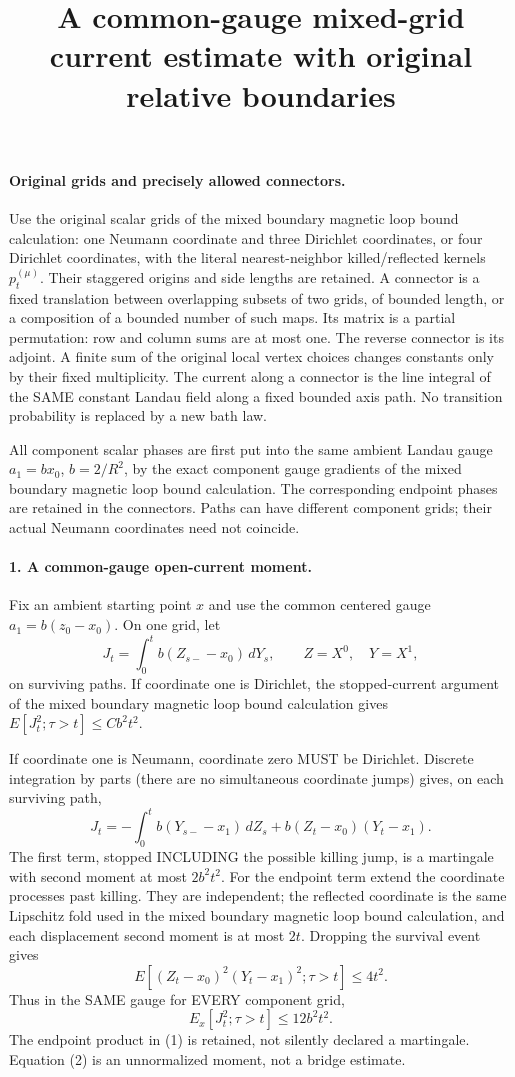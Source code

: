 \documentclass[11pt]{article}
\title{A common-gauge mixed-grid current estimate with original relative boundaries}\author{}\date{}
\begin{document}
\maketitle
\paragraph{Original grids and precisely allowed connectors.}
Use the original scalar grids of the mixed boundary magnetic loop bound calculation: one Neumann coordinate and
three Dirichlet coordinates, or four Dirichlet coordinates, with the
literal nearest-neighbor killed/reflected kernels $p_t^{(\mu)}$.
Their staggered origins and side lengths are retained. A connector is a
fixed translation between overlapping subsets of two grids, of bounded
length, or a composition of a bounded number of such maps.
Its matrix is a partial permutation: row and column sums are at most one.
The reverse connector is its adjoint. A finite sum of the original local
vertex choices changes constants only by their fixed multiplicity.
The current along a connector is the line integral of the SAME constant
Landau field along a fixed bounded axis path. No transition probability
is replaced by a new bath law.

All component scalar phases are first put into the same ambient Landau
gauge $a_1=b x_0$, $b=2/R^2$, by the exact component gauge gradients of
the mixed boundary magnetic loop bound calculation. The corresponding endpoint phases are retained in the
connectors. Paths can have different component grids; their actual
Neumann coordinates need not coincide.

\paragraph{1. A common-gauge open-current moment.}
Fix an ambient starting point $x$ and use the common centered gauge
$a_1=b(z_0-x_0)$. On one grid, let
\[
 J_t=\int_0^t b(Z_{s-}-x_0)\,dY_s,\qquad Z=X^0,\quad Y=X^1,
\]
on surviving paths. If coordinate one is Dirichlet, the stopped-current
argument of the mixed boundary magnetic loop bound calculation gives $E[J_t^2;\tau>t]\le Cb^2t^2$.

If coordinate one is Neumann, coordinate zero MUST be Dirichlet.
Discrete integration by parts (there are no simultaneous coordinate
jumps) gives, on each surviving path,
\[
 J_t=-\int_0^t b(Y_{s-}-x_1)\,dZ_s
                  +b(Z_t-x_0)(Y_t-x_1).                         \tag{1}
\]
The first term, stopped INCLUDING the possible killing jump, is a
martingale with second moment at most $2b^2t^2$.
For the endpoint term extend the coordinate processes past killing.
They are independent; the reflected coordinate is the same Lipschitz
fold used in the mixed boundary magnetic loop bound calculation, and each displacement second moment is at
most $2t$. Dropping the survival event gives
\[
 E[(Z_t-x_0)^2(Y_t-x_1)^2;\tau>t]\le4t^2.
\]
Thus in the SAME gauge for EVERY component grid,
\[
 \boxed{E_x[J_t^2;\tau>t]\le12b^2t^2.}                            \tag{2}
\]
The endpoint product in (1) is retained, not silently declared a
martingale. Equation (2) is an unnormalized moment, not a bridge estimate.
\end{document}
